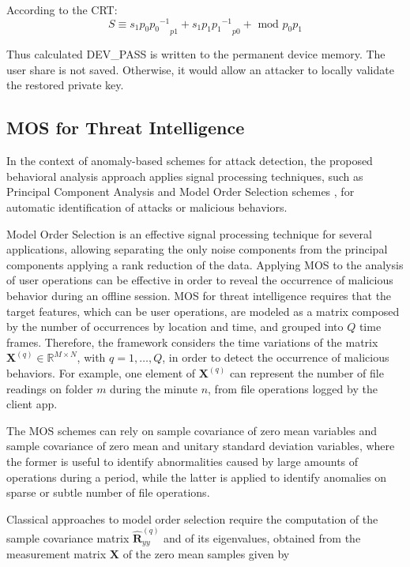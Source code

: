 \documentclass[twocolumn]{svjour3}          	%
\begin{document}
According to the CRT:
\begin{equation}\label{eq:eq02}
S \equiv {s_{1}p_{0}{p_0}^{-1}}_{p1} + {s_{1}p_{1}{p_1}^{-1}}_{p0} + \textrm{ mod } p_0p_1
\end{equation}

Thus calculated DEV\_PASS is written to the permanent device memory. The user share is not saved. Otherwise, it would allow an attacker to locally validate the restored private key.

\subsection{MOS for Threat Intelligence}
\label{sec_mos}
In the context of anomaly-based schemes for attack detection, the proposed behavioral analysis approach applies signal processing techniques, such as Principal Component Analysis and Model Order Selection schemes \cite{tenorio2013greatest}, for automatic identification of attacks or malicious behaviors. 

Model Order Selection is an effective signal processing technique for several applications, allowing separating the only noise components from the principal components applying a rank reduction of the data. Applying MOS to the analysis of user operations can be effective in order to reveal the occurrence of malicious behavior during an offline session. MOS for threat intelligence requires that the target features, which can be user operations, are modeled as a matrix composed by the number of occurrences by location and time, and grouped into $Q$ time frames. Therefore, the framework considers the time variations of the matrix $\mathbf{X}^{(q)} \in \mathbb{R}^{M\times{N}}$, with $q = 1, \ldots, Q$, in order to detect the occurrence of malicious behaviors. For example, one element of $\mathbf{X}^{(q)}$ can represent the number of file readings on folder $m$ during the minute $n$, from file operations logged by the client app.

The MOS schemes can rely on sample covariance of zero mean variables and sample covariance of zero mean and unitary standard deviation variables, where the former is useful to identify abnormalities caused by large amounts of operations during a period, while the latter is applied to identify anomalies on sparse or subtle number of file operations.

Classical approaches to model order selection require the computation of the sample covariance matrix $\mathbf{\hat{R}}_{yy}^{(q)}$ and of its eigenvalues, obtained from the measurement matrix $\mathbf{X}$ of the zero mean samples given by
\end{document}

